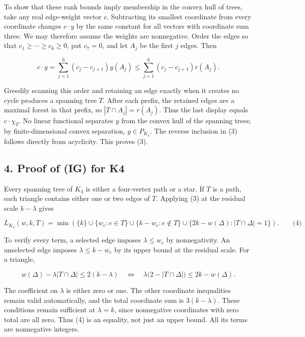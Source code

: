 \documentclass{article}
\begin{document}
To show that these rank bounds imply membership in the convex hull of trees, take any real edge-weight vector \(c\). Subtracting its smallest coordinate from every coordinate changes \(c\cdot y\) by the same constant for all vectors with coordinate sum three. We may therefore assume the weights are nonnegative. Order the edges so that \(c_1\ge\cdots\ge c_6\ge0\), put \(c_7=0\), and let \(A_j\) be the first \(j\) edges. Then

\[
c\cdot y=\sum_{j=1}^6(c_j-c_{j+1})y(A_j)
\le\sum_{j=1}^6(c_j-c_{j+1})r(A_j).
\]

Greedily scanning this order and retaining an edge exactly when it creates no cycle produces a spanning tree \(T\). After each prefix, the retained edges are a maximal forest in that prefix, so \(|T\cap A_j|=r(A_j)\). Thus the last display equals \(c\cdot\chi_T\). No linear functional separates \(y\) from the convex hull of the spanning trees; by finite-dimensional convex separation, \(y\in P_{K_4}\). The reverse inclusion in (3) follows directly from acyclicity. This proves (3).

\subsection{4. Proof of (IG) for K4}

Every spanning tree of \(K_4\) is either a four-vertex path or a star. If \(T\) is a path, each triangle contains either one or two edges of \(T\). Applying (3) at the residual scale \(k-\lambda\) gives

\[
\boxed{
L_{K_4}(w,k,T)=\min\left(
\{k\}
\cup\{w_e:e\in T\}
\cup\{k-w_e:e\notin T\}
\cup\{2k-w(\Delta):|T\cap\Delta|=1\}
\right).}\qquad\text{(4)}
\]

To verify every term, a selected edge imposes \(\lambda\le w_e\) by nonnegativity. An unselected edge imposes \(\lambda\le k-w_e\) by its upper bound at the residual scale. For a triangle,

\[
w(\Delta)-\lambda|T\cap\Delta|\le2(k-\lambda)
\quad\Longleftrightarrow\quad
\lambda\bigl(2-|T\cap\Delta|\bigr)\le2k-w(\Delta).
\]

The coefficient on \(\lambda\) is either zero or one. The other coordinate inequalities remain valid automatically, and the total coordinate sum is \(3(k-\lambda)\). These conditions remain sufficient at \(\lambda=k\), since nonnegative coordinates with zero total are all zero. Thus (4) is an equality, not just an upper bound. All its terms are nonnegative integers.
\end{document}
